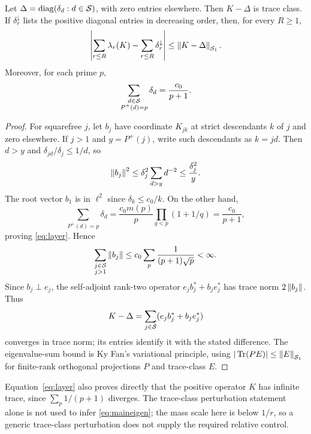\begin{proposition}\label{prop:traceclass}
Let $\Delta=\operatorname{diag}(\delta_d:d\in\mathcal S)$, with zero entries elsewhere.
Then $K-\Delta$ is trace class. If $\delta_r^\downarrow$ lists the
positive diagonal entries in decreasing order, then, for every $R\ge1$,
\[
 \left|\sum_{r\le R}\lambda_r(K)
             -\sum_{r\le R}\delta_r^\downarrow\right|
 \le\left\lVert K-\Delta\right\rVert_{\mathcal S_1}.
\]
Moreover, for each prime $p$,
\begin{equation}\label{eq:layer}
 \sum_{\substack{d\in\mathcal S\\P^+(d)=p}}\delta_d=\frac{c_0}{p+1}.
\end{equation}
\end{proposition}
\begin{proof}
For squarefree $j$, let $b_j$ have coordinate $K_{jk}$ at strict
descendants $k$ of $j$ and zero elsewhere. If $j>1$ and $y=P^+(j)$,
write such descendants as $k=jd$. Then $d>y$ and
$\delta_{jd}/\delta_j\le1/d$, so
\[
 \left\lVert b_j\right\rVert^2\le\delta_j^2\sum_{d>y}d^{-2}\le\frac{\delta_j^2}{y}.
\]
The root vector $b_1$ is in $\ell^2$ since $\delta_k\le c_0/k$.
On the other hand,
\[
 \sum_{P^+(d)=p}\delta_d
 =\frac{c_0m(p)}p
       \prod_{q<p}(1+1/q)
 =\frac{c_0}{p+1},
\]
proving \eqref{eq:layer}. Hence
\[
 \sum_{\substack{j\in\mathcal S\\j>1}}\left\lVert b_j\right\rVert
 \le c_0\sum_p\frac1{(p+1)\sqrt p}<\infty.
\]
Since $b_j\perp e_j$, the self-adjoint rank-two operator
$e_jb_j^*+b_je_j^*$ has trace norm $2\left\lVert b_j\right\rVert$. Thus
\[
 K-\Delta=\sum_{j\in\mathcal S}(e_jb_j^*+b_je_j^*)
\]
converges in trace norm; its entries identify it with the stated
difference. The eigenvalue-sum bound is Ky Fan's variational principle,
using $|\operatorname{Tr}(PE)|\le\left\lVert E\right\rVert_{\mathcal S_1}$ for finite-rank orthogonal
projections $P$ and trace-class $E$.
\end{proof}

Equation~\eqref{eq:layer} also proves directly that the positive operator
$K$ has infinite trace, since $\sum_p1/(p+1)$ diverges.
The trace-class perturbation statement alone is not used to infer
\eqref{eq:maineigen}; the mass scale here is below $1/r$, so a generic
trace-class perturbation does not supply the required relative control.
